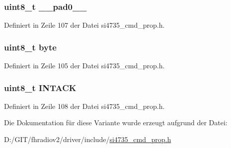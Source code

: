 \subsubsection[{\+\_\+\+\_\+pad0\+\_\+\+\_\+}]{\setlength{\rightskip}{0pt plus 5cm}uint8\+\_\+t \+\_\+\+\_\+pad0\+\_\+\+\_\+}\label{unionfm__rsq__status__arg1_a8b4eebe79ded0459acec2f4950102ba3}


Definiert in Zeile 107 der Datei si4735\+\_\+cmd\+\_\+prop.\+h.

\hypertarget{unionfm__rsq__status__arg1_a96f44d20f1dbf1c8785a7bc99a46164c}{}
\subsubsection[{byte}]{\setlength{\rightskip}{0pt plus 5cm}uint8\+\_\+t byte}\label{unionfm__rsq__status__arg1_a96f44d20f1dbf1c8785a7bc99a46164c}


Definiert in Zeile 105 der Datei si4735\+\_\+cmd\+\_\+prop.\+h.

\hypertarget{unionfm__rsq__status__arg1_adf4f80d8fb205d6c93c6423d84d63d9c}{}
\subsubsection[{I\+N\+T\+A\+C\+K}]{\setlength{\rightskip}{0pt plus 5cm}uint8\+\_\+t I\+N\+T\+A\+C\+K}\label{unionfm__rsq__status__arg1_adf4f80d8fb205d6c93c6423d84d63d9c}


Definiert in Zeile 108 der Datei si4735\+\_\+cmd\+\_\+prop.\+h.



Die Dokumentation für diese Variante wurde erzeugt aufgrund der Datei\+:\begin{DoxyCompactItemize}
\item 
D\+:/\+G\+I\+T/fhradiov2/driver/include/\hyperlink{si4735__cmd__prop_8h}{si4735\+\_\+cmd\+\_\+prop.\+h}\end{DoxyCompactItemize}
